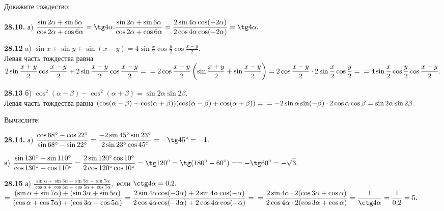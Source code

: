 \documentclass[a5paper,10pt]{article}
\begin{document}
\medskip
\noindent
Докажите тождество:

\medskip
\noindent
{\bf 28.10.}
а) $\displaystyle \frac{\sin2\alpha+\sin6\alpha}{\cos2\alpha+\cos6\alpha}=\tg4\alpha.\\[3pt]
\frac{\sin2\alpha+\sin6\alpha}{\cos2\alpha+\cos6\alpha}=
\frac{2\sin4\alpha\cos(-2\alpha)}{2\cos4\alpha\cos(-2\alpha)}=\tg4\alpha.$

\medskip
\noindent
{\bf 28.12} a) $\displaystyle \sin x+\sin y+\sin(x-y)=
4\sin\frac{x}{2}\cos\frac{y}{2}\cos\frac{x-y}{2}.$\\
Левая часть тождества равна
$\displaystyle 2\sin\frac{x+y}{2}\cos\frac{x-y}{2}+2\sin\frac{x-y}{2}\cos\frac{x-y}{2}=\\
=2\cos\frac{x-y}{2}\left(\sin\frac{x+y}{2}+\sin\frac{x-y}{2}\right)=
2\cos\frac{x-y}{2}\cdot2\sin\frac{x}{2}\cos\frac{y}{2}=\\
=4\sin\frac{x}{2}\cos\frac{y}{2}\cos\frac{x-y}{2}.$

\medskip
\noindent
{\bf 28.13} б) $\cos^2(\alpha-\beta)-\cos^2(\alpha+\beta)=\sin2\alpha\sin2\beta.$\\
Левая часть тождества равна $(\cos(\alpha-\beta)-\cos(\alpha+\beta))
(\cos(\alpha-\beta)+\cos(\alpha+\beta))=\\
=-2\sin\alpha\sin(-\beta)\cdot2\cos\alpha\cos\beta=
\sin2\alpha\sin2\beta.$

\medskip
\noindent
Вычислите:

\medskip
\noindent
{\bf 28.14.}
а) $\displaystyle \frac{\cos68^\circ-\cos22^\circ}{\sin68^\circ-\sin22^\circ}=
\frac{-2\sin45^\circ\sin23^\circ}{2\sin23^\circ\cos45^\circ}=-\tg45^\circ=-1.$

\medskip
\noindent
в) $\displaystyle \frac{\sin130^\circ+\sin110^\circ}{\cos130^\circ+\cos110^\circ}=
\frac{2\sin120^\circ\cos10^\circ}{2\cos120^\circ\cos10^\circ}=\tg120^\circ=
\tg(180^\circ-60^\circ)=\\[3pt]
=-\tg60^\circ=-\sqrt3.$

\medskip
\noindent
{\bf 28.15} а) $\displaystyle \frac{\sin\alpha+\sin3\alpha+\sin5\alpha+\sin7\alpha}
{\cos\alpha+\cos3\alpha+\cos5\alpha+\cos7\alpha},$ если $\ctg4\alpha=0{,}2.$\\
$=\displaystyle \frac{(\sin\alpha+\sin7\alpha)+(\sin3\alpha+\sin5\alpha)}
{(\cos\alpha+\cos7\alpha)+(\cos3\alpha+\cos5\alpha)}=
\frac{2\sin4\alpha\cos(-3\alpha)+2\sin4\alpha\cos(-\alpha)}
{2\cos4\alpha\cos(-3\alpha)+2\cos4\alpha\cos(-\alpha)}=\\
=\frac{2\sin4\alpha\cdot2(\cos3\alpha+\cos\alpha)}
{2\cos4\alpha\cdot2(\cos3\alpha+\cos\alpha)}=\frac{1}{\ctg4\alpha}=\frac{1}{0{,}2}=5.$
\end{document}
